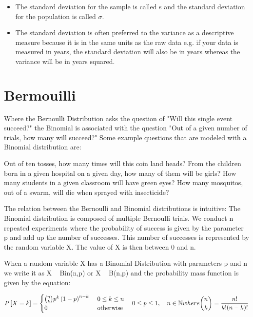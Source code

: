 \begin{itemize}
\item The standard deviation for the sample is called s and the standard deviation for the population is called $\sigma$.
\item The standard deviation is often preferred to the variance as a descriptive measure because it is in the same units as the raw data e.g. if your data is measured in years, the standard deviation will also be in years whereas the variance will be in years squared.
\end{itemize}


\section{Bermouilli}

Where the Bernoulli Distribution asks the question of "Will this single event succeed?" the Binomial is associated with the question "Out of a given number of trials, how many will succeed?" Some example questions that are modeled with a Binomial distribution are:

Out of ten tosses, how many times will this coin land heads?
From the children born in a given hospital on a given day, how many of them will be girls?
How many students in a given classroom will have green eyes?
How many mosquitos, out of a swarm, will die when sprayed with insecticide?




The relation between the Bernoulli and Binomial distributions is intuitive: The Binomial distribution is composed of multiple Bernoulli trials. We conduct n repeated experiments where the probability of success is given by the parameter p and add up the number of successes. This number of successes is represented by the random variable X. The value of X is then between 0 and n.

When a random variable X has a Binomial Distribution with parameters p and n we write it as X ~ Bin(n,p) or X ~ B(n,p) and the probability mass function is given by the equation:

\[P\left[X = k\right] = \begin{cases} {n \choose k} p^k \left(1-p\right)^{n-k}\ & 0 \le k \le n \\ 0 & \mbox{otherwise} \end{cases} \quad 0 \leq p \leq 1, \quad n \in \mathbb{N}
where {n \choose k}={n! \over k!(n-k)!}\]


